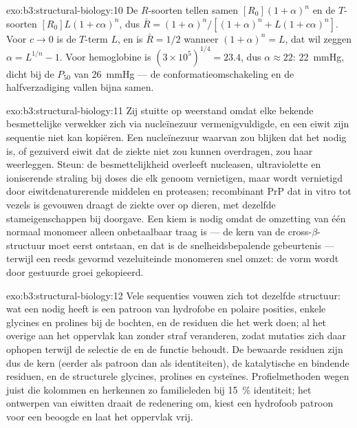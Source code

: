\begin{solution}{exo:b3:structural-biology:10}
De $R$-soorten tellen samen $[R_{0}](1+\alpha)^{n}$ en de $T$-soorten
$[R_{0}]L(1+c\alpha)^{n}$, dus $\bar R = (1+\alpha)^{n}/[(1+\alpha)^{n}
+ L(1+c\alpha)^{n}]$. Voor $c \to 0$ is de $T$-term $L$, en is $\bar R =
1/2$ wanneer $(1+\alpha)^{n} = L$, dat wil zeggen $\alpha = L^{1/n} - 1$.
Voor hemoglobine is $(3\times 10^{5})^{1/4} = 23.4$, dus $\alpha \approx 22$:
\qty{22}{mmHg}, dicht bij de $P_{50}$ van \qty{26}{mmHg} --- de
conformatieomschakeling en de halfverzadiging vallen bijna samen.
\end{solution}

\begin{solution}{exo:b3:structural-biology:11}
Zij stuitte op weerstand omdat elke bekende besmettelijke verwekker
zich via nucleïnezuur vermenigvuldigde, en een eiwit zijn sequentie
niet kan kopiëren. Een nucleïnezuur waarvan zou blijken dat het nodig
is, of gezuiverd eiwit dat de ziekte niet zou kunnen overdragen, zou
haar weerleggen. Steun: de besmettelijkheid overleeft nucleasen,
ultraviolette en ioniserende straling bij doses die elk genoom
vernietigen, maar wordt vernietigd door eiwitdenaturerende middelen en
proteasen; recombinant PrP dat in vitro tot vezels is gevouwen draagt
de ziekte over op dieren, met dezelfde stameigenschappen bij
doorgave. Een kiem is nodig omdat de omzetting van één normaal monomeer
alleen onbetaalbaar traag is --- de kern van de
cross-$\beta$-structuur moet eerst ontstaan, en dat is de
snelheidsbepalende gebeurtenis --- terwijl een reeds gevormd
vezeluiteinde monomeren snel omzet: de vorm wordt door gestuurde groei
gekopieerd.
\end{solution}

\begin{solution}{exo:b3:structural-biology:12}
Vele sequenties vouwen zich tot dezelfde structuur: wat een 
nodig heeft is een patroon van hydrofobe en polaire posities, enkele
glycines en prolines bij de bochten, en de residuen die het werk doen;
al het overige aan het oppervlak kan zonder straf veranderen, zodat
mutaties zich daar ophopen terwijl de selectie de  en de functie
behoudt. De bewaarde residuen zijn dus de kern (eerder als patroon dan
als identiteiten), de katalytische en bindende residuen, en de
structurele glycines, prolines en cysteïnes. Profielmethoden wegen juist
die kolommen en herkennen zo familieleden bij \qty{15}{\%} identiteit;
het ontwerpen van eiwitten draait de redenering om, kiest een hydrofoob
patroon voor een beoogde  en laat het oppervlak vrij.
\end{solution}

